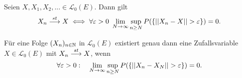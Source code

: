 \begin{theorem}
    Seien $X, X_1,X_2,... \in \mathcal{L}_0(E)$. Dann gilt
    \begin{align*}
        X_n \overset{st}{\longrightarrow} X \iff \forall \varepsilon > 0 \ \lim_{N \to \infty}\sup_{n \geq N}P(\{\lvert\lvert X_n - X \rvert\rvert > \varepsilon \}) = 0.
    \end{align*}
\end{theorem}

\begin{theorem}
    Für eine Folge $(X_n)_{n \in \mathbb{N}}$ in $\mathcal{L}_0(E)$ existiert genau dann eine Zufallsvariable $X \in \mathcal{L}_0(E)$ mit $X_n \overset{st}{\longrightarrow} X$, wenn
    $$
        \forall \varepsilon > 0 : \quad \lim_{N \to \infty}\sup_{n\geq N}P(\{\lvert\lvert X_n - X_N \rvert\rvert > \varepsilon \}) = 0. 
    $$
\end{theorem}


